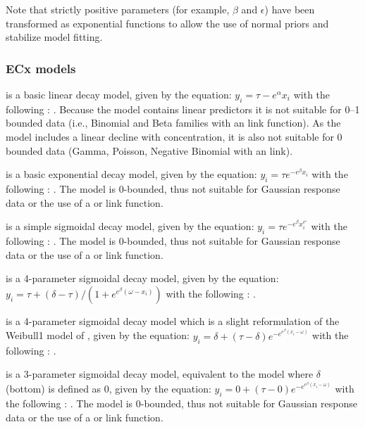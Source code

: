 \documentclass[
  shortnames]{jss}
\begin{document}
Note that strictly positive parameters (for example, \(\beta\) and \(\epsilon\)) have been transformed as exponential functions to allow the use of normal priors and stabilize model fitting.

\subsubsection[ECx models]{ECx models}\label{ecx-models}

 is a basic linear decay model, given by the equation:
\(y_i = \tau - e^{\alpha} x_i\)
with the following : . Because the model contains linear predictors it is not suitable for 0--1 bounded data (i.e., Binomial and Beta families with an  link function). As the model includes a linear decline with concentration, it is also not suitable for 0 bounded data (Gamma, Poisson, Negative Binomial with an  link).

 is a basic exponential decay model, given by the equation: \(y_i = \tau e^{-e^{\beta} x_i}\)
with the following : . The model is 0-bounded, thus not suitable for Gaussian response data or the use of a  or  link function.

 is a simple sigmoidal decay model, given by the equation:
\(y_i = \tau e^{-e^{\beta} x_i^{e^\epsilon}}\)
with the following : . The model is 0-bounded, thus not suitable for Gaussian response data or the use of a  or  link function.

 is a 4-parameter sigmoidal decay model, given by the equation:
\(y_i = \tau + (\delta - \tau)/(1 + e^{e^{\beta} (\omega - x_i)})\)
with the following : .

 is a 4-parameter sigmoidal decay model which is a slight reformulation of the Weibull1 model of \citet{Ritz2016}, given by the equation:
\(y_i = \delta + (\tau - \delta) e^{-e^{e^{\beta} (x_i - \omega)}}\)
with the following : .

 is a 3-parameter sigmoidal decay model, equivalent to the  model where \(\delta\) (bottom) is defined as 0, given by the equation:
\(y_i = {0} + (\tau - {0}) e^{-e^{e^{\beta} (x_i - \omega)}}\)
with the following : . The model is 0-bounded, thus not suitable for Gaussian response data or the use of a  or  link function.
\end{document}
